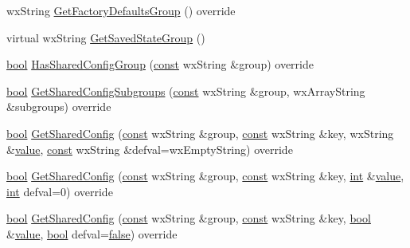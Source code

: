 \begin{DoxyCompactItemize}
wx\+String \hyperlink{class_effect_aa747ec7e5692818cfd72b6f242d884a3}{Get\+Factory\+Defaults\+Group} () override
\item 
virtual wx\+String \hyperlink{class_effect_aabafd440031f63f99fb4d799eecf9ac0}{Get\+Saved\+State\+Group} ()
\item 
\hyperlink{mac_2config_2i386_2lib-src_2libsoxr_2soxr-config_8h_abb452686968e48b67397da5f97445f5b}{bool} \hyperlink{class_effect_a645a432fc388c86581550c923e253b41}{Has\+Shared\+Config\+Group} (\hyperlink{getopt1_8c_a2c212835823e3c54a8ab6d95c652660e}{const} wx\+String \&group) override
\item 
\hyperlink{mac_2config_2i386_2lib-src_2libsoxr_2soxr-config_8h_abb452686968e48b67397da5f97445f5b}{bool} \hyperlink{class_effect_ad54efb61c552d1cca8f29e8d647fa36d}{Get\+Shared\+Config\+Subgroups} (\hyperlink{getopt1_8c_a2c212835823e3c54a8ab6d95c652660e}{const} wx\+String \&group, wx\+Array\+String \&subgroups) override
\item 
\hyperlink{mac_2config_2i386_2lib-src_2libsoxr_2soxr-config_8h_abb452686968e48b67397da5f97445f5b}{bool} \hyperlink{class_effect_a819ad04ac237def6599bc74b095cf0ee}{Get\+Shared\+Config} (\hyperlink{getopt1_8c_a2c212835823e3c54a8ab6d95c652660e}{const} wx\+String \&group, \hyperlink{getopt1_8c_a2c212835823e3c54a8ab6d95c652660e}{const} wx\+String \&key, wx\+String \&\hyperlink{lib_2expat_8h_a4a30a13b813682e68c5b689b45c65971}{value}, \hyperlink{getopt1_8c_a2c212835823e3c54a8ab6d95c652660e}{const} wx\+String \&defval=wx\+Empty\+String) override
\item 
\hyperlink{mac_2config_2i386_2lib-src_2libsoxr_2soxr-config_8h_abb452686968e48b67397da5f97445f5b}{bool} \hyperlink{class_effect_aaa9b1c47bdcc380d50e9ccf76264c66b}{Get\+Shared\+Config} (\hyperlink{getopt1_8c_a2c212835823e3c54a8ab6d95c652660e}{const} wx\+String \&group, \hyperlink{getopt1_8c_a2c212835823e3c54a8ab6d95c652660e}{const} wx\+String \&key, \hyperlink{xmltok_8h_a5a0d4a5641ce434f1d23533f2b2e6653}{int} \&\hyperlink{lib_2expat_8h_a4a30a13b813682e68c5b689b45c65971}{value}, \hyperlink{xmltok_8h_a5a0d4a5641ce434f1d23533f2b2e6653}{int} defval=0) override
\item 
\hyperlink{mac_2config_2i386_2lib-src_2libsoxr_2soxr-config_8h_abb452686968e48b67397da5f97445f5b}{bool} \hyperlink{class_effect_a6deabb5b32549bbe89132ee1a7a9c916}{Get\+Shared\+Config} (\hyperlink{getopt1_8c_a2c212835823e3c54a8ab6d95c652660e}{const} wx\+String \&group, \hyperlink{getopt1_8c_a2c212835823e3c54a8ab6d95c652660e}{const} wx\+String \&key, \hyperlink{mac_2config_2i386_2lib-src_2libsoxr_2soxr-config_8h_abb452686968e48b67397da5f97445f5b}{bool} \&\hyperlink{lib_2expat_8h_a4a30a13b813682e68c5b689b45c65971}{value}, \hyperlink{mac_2config_2i386_2lib-src_2libsoxr_2soxr-config_8h_abb452686968e48b67397da5f97445f5b}{bool} defval=\hyperlink{mac_2config_2i386_2lib-src_2libsoxr_2soxr-config_8h_a65e9886d74aaee76545e83dd09011727}{false}) override

\end{DoxyCompactItemize}
